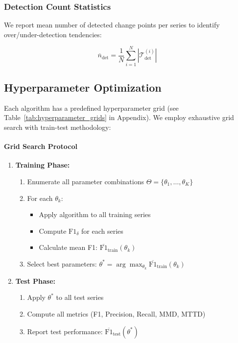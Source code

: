\subsubsection{Detection Count Statistics}

We report mean number of detected change points per series to identify over/under-detection tendencies:

\begin{equation}
\overline{n}_{\text{det}} = \frac{1}{N} \sum_{i=1}^{N} |\mathcal{T}_{\text{det}}^{(i)}|
\end{equation}

\subsection{Hyperparameter Optimization}
\label{sec:hyperparameter_opt}

Each algorithm has a predefined hyperparameter grid (see Table~\ref{tab:hyperparameter_grids} in Appendix). We employ exhaustive grid search with train-test methodology:

\paragraph{Grid Search Protocol}

\begin{enumerate}
    \item \textbf{Training Phase:}
    \begin{enumerate}
        \item Enumerate all parameter combinations $\Theta = \{\theta_1, \ldots, \theta_K\}$
        \item For each $\theta_k$:
        \begin{itemize}
            \item Apply algorithm to all training series
            \item Compute $\text{F1}_{\delta}$ for each series
            \item Calculate mean F1: $\overline{\text{F1}}_{\text{train}}(\theta_k)$
        \end{itemize}
        \item Select best parameters: $\theta^* = \arg\max_{\theta_k} \overline{\text{F1}}_{\text{train}}(\theta_k)$
    \end{enumerate}
    
    \item \textbf{Test Phase:}
    \begin{enumerate}
        \item Apply $\theta^*$ to all test series
        \item Compute all metrics (F1, Precision, Recall, MMD, MTTD)
        \item Report test performance: $\overline{\text{F1}}_{\text{test}}(\theta^*)$
    \end{enumerate}
\end{enumerate}

